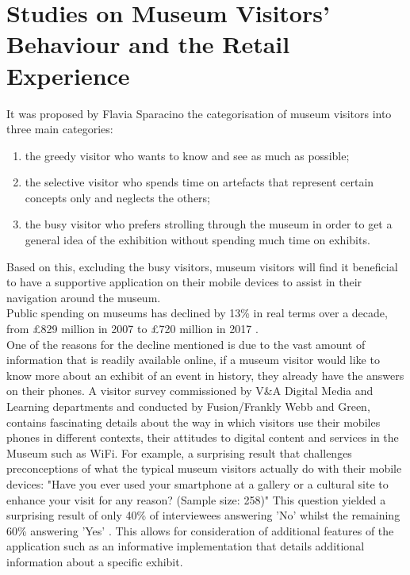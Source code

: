 \section{Studies on Museum Visitors' Behaviour and the Retail Experience}
It was proposed by Flavia Sparacino \cite{sparacino} the categorisation of museum visitors into three main categories: 

\begin{enumerate}
\item the greedy visitor who wants to know and see as much as possible;
\item the selective visitor who spends time on artefacts that represent certain concepts only and neglects the others;
\item the busy visitor who prefers strolling through the museum in order to get a general idea of the exhibition without spending much time on exhibits.
\end{enumerate}

Based on this, excluding the busy visitors, museum visitors will find it beneficial to have a supportive application on their mobile devices to assist in their navigation around the museum.\\

Public spending on museums has declined by 13\% in real terms over a decade, from £829 million in 2007 to £720 million in 2017 \cite{pickford}.\\

One of the reasons for the decline mentioned is due to the vast amount of information that is readily available online, if a museum visitor would like to know more about an exhibit of an event in history, they already have the answers on their phones. A visitor survey commissioned by V\&A Digital Media and Learning departments and conducted by Fusion/Frankly Webb and Green, contains fascinating details about the way in which visitors use their mobiles phones in different contexts, their attitudes to digital content and services in the Museum such as WiFi. For example, a surprising result that challenges preconceptions of what the typical museum visitors actually do with their mobile devices: "Have you ever used your smartphone at a gallery or a cultural site to enhance your visit for any reason? (Sample size: 258)" This question yielded a surprising result of only 40\% of interviewees answering 'No' whilst the remaining 60\% answering 'Yes' \cite{Lewis}. This allows for consideration of additional features of the application such as an informative implementation that details additional information about a specific exhibit.